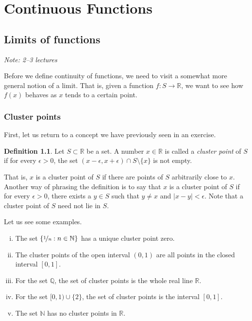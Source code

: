 \documentclass[12pt]{book}
\newcommand{\abs}[1]{\left\lvert {#1} \right\rvert}
\newcommand{\R}{{\mathbb{R}}}
\newcommand{\N}{{\mathbb{N}}}
\newcommand{\Q}{{\mathbb{Q}}}
\newcommand{\myindex}[1]{#1\index{#1}}
\newcommand{\sectionnotes}[1]{\noindent \emph{Note: #1} \medskip \par}
\theoremstyle{plain}
\theoremstyle{remark}
\theoremstyle{definition}
\newtheorem{defn}[thm]{Definition}
\theoremstyle{exercise}
\theoremstyle{example}
\begin{document}
\chapter{Continuous Functions} \label{lim:chapter}


\section{Limits of functions}
\label{sec:limoffunc}

\sectionnotes{2--3 lectures}

Before we define continuity of functions, we need to visit a somewhat
more general notion of a limit.  That is, given a function $f \colon S \to
\R$, we want to see how $f(x)$ behaves as $x$ tends to a certain point.

\subsection{Cluster points}

First,
let us return to a concept we have previously seen in an exercise.

\begin{defn}
Let $S \subset \R$ be a set.  A number $x \in \R$ is called
a \emph{\myindex{cluster point}} of $S$
if for every $\epsilon > 0$, the set $(x-\epsilon,x+\epsilon) \cap S
\setminus \{ x \}$ is not empty.
\end{defn}

That is, $x$ is a cluster point of $S$ if there are points of $S$
arbitrarily close to $x$.  Another way of phrasing the definition is to say
that $x$ is a cluster point of $S$ if for every $\epsilon > 0$, there
exists a $y \in S$ such that $y \not= x$ and $\abs{x - y} < \epsilon$.
Note that a cluster point of $S$ need not lie in $S$.

Let us see some examples.
\begin{enumerate}[(i)]
\item The set
$\{ \nicefrac{1}{n} : n \in \N \}$ has a unique cluster point zero.
\item The cluster points of the open interval $(0,1)$ are
all points in the closed interval $[0,1]$.
\item For the set $\Q$, the set of
cluster points is the whole real line $\R$.
\item For the set $[0,1) \cup \{ 2 \}$,
the set of cluster points is the interval $[0,1]$.
\item The set $\N$ has no cluster points in $\R$.
\end{enumerate}
\end{document}
